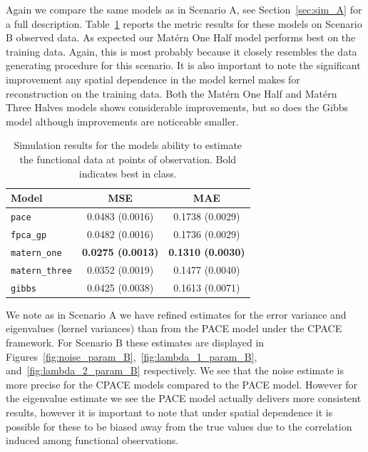 Again we compare the same models as in Scenario A, see Section~\ref{sec:sim_A} for a full description.
Table~\ref{tab:train_B} reports the metric results for these models on Scenario B observed data.
As expected our Mat\'ern One Half model performs best on the training data.
Again, this is most probably because it closely resembles the data generating procedure for this scenario.
It is also important to note the significant improvement any spatial dependence in the model kernel makes for reconstruction on the training data.
Both the Mat\'ern One Half and Mat\'ern Three Halves models shows considerable improvements, but so does the Gibbs model although improvements are noticeable smaller.


\begin{table}
	\caption[Simulation results for Scenario B on observed data]{Simulation results for the models ability to estimate the functional data at points of observation. Bold indicates best in class.}
	\centering
	\label{tab:train_B}
	\begin{tabular}{lcc}
		\toprule
		\textbf{Model} & \textbf{MSE} & \textbf{MAE} \\
		\midrule
		\verb*|pace| & 0.0483 (0.0016) & 0.1738	(0.0029) \\
		\verb*|fpca_gp| & 0.0482 (0.0016) & 0.1736 (0.0029) \\
		\verb*|matern_one| & \textbf{0.0275	(0.0013)} & \textbf{0.1310	(0.0030)} \\
		\verb*|matern_three| & 0.0352 (0.0019) & 0.1477	(0.0040) \\
		\verb*|gibbs| & 0.0425 (0.0038) & 0.1613 (0.0071)\\
		\bottomrule
	\end{tabular}
\end{table}

We note as in Scenario A we have refined estimates for the error variance and eigenvalues (kernel variances) than from the PACE model under the CPACE framework. 
For Scenario B these estimates are displayed in Figures~\ref{fig:noise_param_B},~\ref{fig:lambda_1_param_B}, and~\ref{fig:lambda_2_param_B} respectively. 
We see that the noise estimate is more precise for the CPACE models compared to the PACE model.
However for the eigenvalue estimate we see the PACE model actually delivers more consistent results, however it is important to note that under spatial dependence it is possible for these to be biased away from the true values due to the correlation induced among functional observations.

